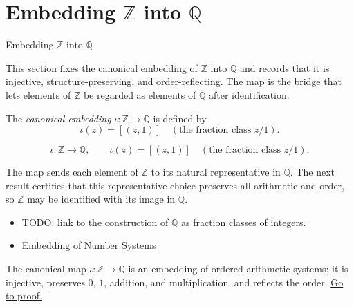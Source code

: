 \section{Embedding $\mathbb{Z}$ into $\mathbb{Q}$}
\label{sec:embedding-z-into-q}

\begin{topicbox}{Embedding $\mathbb{Z}$ into $\mathbb{Q}$}
\begin{exposition}
This section fixes the canonical embedding of $\mathbb{Z}$ into $\mathbb{Q}$ and records that it is injective, structure-preserving, and order-reflecting. The map is the bridge that lets elements of $\mathbb{Z}$ be regarded as elements of $\mathbb{Q}$ after identification.
\end{exposition}
\end{topicbox}
\begin{tcolorbox}[colback=defbox, colframe=defborder, arc=2pt,
  left=6pt, right=6pt, top=4pt, bottom=4pt,
  title={\small\textbf{Definition (Embedding $\mathbb{Z}$ into $\mathbb{Q}$)}},
  fonttitle=\small\bfseries]
\begin{definition}
\label{def:embedding-z-into-q}
The \emph{canonical embedding} $\iota:\mathbb{Z}\to \mathbb{Q}$ is defined by
\[
\iota(z)=\left[(z,1)\right] \quad(\text{the fraction class } z/1).
\]
\end{definition}
\end{tcolorbox}
\begin{remark*}
\[
\iota:\mathbb{Z}\to \mathbb{Q},\qquad \iota(z)=\left[(z,1)\right] \quad(\text{the fraction class } z/1).
\]
\end{remark*}
\begin{remark*}[Interpretation]
The map sends each element of $\mathbb{Z}$ to its natural representative in $\mathbb{Q}$. The next result certifies that this representative choice preserves all arithmetic and order, so $\mathbb{Z}$ may be identified with its image in $\mathbb{Q}$.
\end{remark*}
\begin{dependencies}
\begin{itemize}
  \item TODO: link to the construction of $\mathbb{Q}$ as fraction classes of integers.
  \item \hyperref[def:number-system-embedding]{Embedding of Number Systems}
\end{itemize}
\end{dependencies}
\begin{tcolorbox}[colback=thmbox, colframe=thmborder, arc=2pt,
  left=6pt, right=6pt, top=4pt, bottom=4pt,
  title={\small\textbf{Theorem ($\mathbb{Z}$ Embeds in $\mathbb{Q}$)}},
  fonttitle=\small\bfseries]
\begin{theorem}
\label{thm:z-embeds-in-q}
The canonical map $\iota:\mathbb{Z}\to \mathbb{Q}$ is an embedding of ordered arithmetic systems: it is injective, preserves $0$, $1$, addition, and multiplication, and reflects the order.
\hyperref[prf:z-embeds-in-q]{Go to proof.}
\end{theorem}
\end{tcolorbox}
